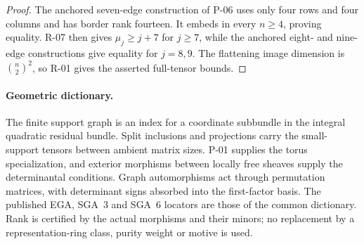 \begin{proof}
The anchored seven-edge construction of P-06 uses only four
rows and four columns and has border rank fourteen. It embeds
in every $n\geq4$, proving equality. R-07 then gives
$\mu_j\geq j+7$ for $j\geq7$, while the anchored eight- and
nine-edge constructions give equality for $j=8,9$.
The flattening image dimension is $\binom n2^2$, so R-01 gives
the asserted full-tensor bounds.
\end{proof}

\paragraph{Geometric dictionary.}
The finite support graph is an index for a coordinate subbundle
in the integral quadratic residual bundle. Split inclusions and
projections carry the small-support tensors between ambient
matrix sizes. P-01 supplies the torus specialization, and
exterior morphisms between locally free sheaves supply the
determinantal conditions. Graph automorphisms act through
permutation matrices, with determinant signs absorbed into
the first-factor basis. The published EGA, SGA~3 and SGA~6
locators are those of the common dictionary. Rank is certified
by the actual morphisms and their minors; no replacement by
a representation-ring class, purity weight or motive is used.
